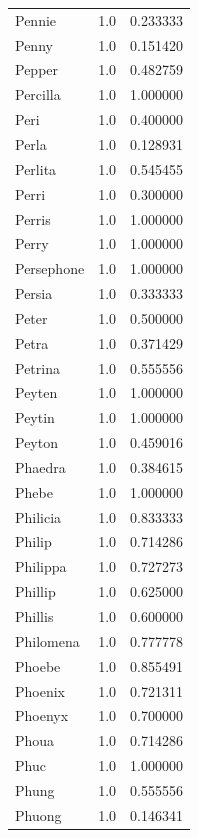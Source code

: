 \documentclass[
  letterpaper,
  DIV=11,
  numbers=noendperiod]{scrreprt}
\begin{document}
\begin{tabular}{lrr}
Pennie          &   1.0 &   0.233333 \\
Penny           &   1.0 &   0.151420 \\
Pepper          &   1.0 &   0.482759 \\
Percilla        &   1.0 &   1.000000 \\
Peri            &   1.0 &   0.400000 \\
Perla           &   1.0 &   0.128931 \\
Perlita         &   1.0 &   0.545455 \\
Perri           &   1.0 &   0.300000 \\
Perris          &   1.0 &   1.000000 \\
Perry           &   1.0 &   1.000000 \\
Persephone      &   1.0 &   1.000000 \\
Persia          &   1.0 &   0.333333 \\
Peter           &   1.0 &   0.500000 \\
Petra           &   1.0 &   0.371429 \\
Petrina         &   1.0 &   0.555556 \\
Peyten          &   1.0 &   1.000000 \\
Peytin          &   1.0 &   1.000000 \\
Peyton          &   1.0 &   0.459016 \\
Phaedra         &   1.0 &   0.384615 \\
Phebe           &   1.0 &   1.000000 \\
Philicia        &   1.0 &   0.833333 \\
Philip          &   1.0 &   0.714286 \\
Philippa        &   1.0 &   0.727273 \\
Phillip         &   1.0 &   0.625000 \\
Phillis         &   1.0 &   0.600000 \\
Philomena       &   1.0 &   0.777778 \\
Phoebe          &   1.0 &   0.855491 \\
Phoenix         &   1.0 &   0.721311 \\
Phoenyx         &   1.0 &   0.700000 \\
Phoua           &   1.0 &   0.714286 \\
Phuc            &   1.0 &   1.000000 \\
Phung           &   1.0 &   0.555556 \\
Phuong          &   1.0 &   0.146341 \\

\end{tabular}
\end{document}
